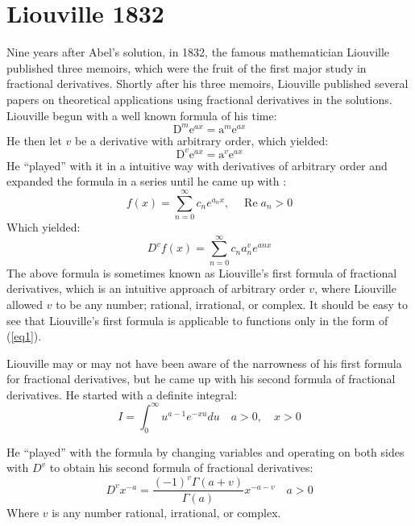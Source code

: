 \documentclass[a4paper,14pt,oneside]{book}
\theoremstyle{plain}
\theoremstyle{definition}
\theoremstyle{remark}
\begin{document}
\section{Liouville 1832}
         \begin{center}
         \begin{flushleft} 
         \justify
         \Large{
\par{Nine years after Abel's solution, in 1832, the famous mathematician Liouville published three memoirs, which were the fruit of the first major study in fractional derivatives. Shortly after his three memoirs, Liouville published several papers on theoretical applications using fractional derivatives in the solutions. Liouville begun with a well known formula of his time:
$$
\mathrm{D}^{m} \mathrm{e}^{ax}=\mathrm{a}^{m} \mathrm{e}^{ax}
$$He then let $v$ be a derivative with arbitrary order, which yielded:
$$
\mathrm{D}^{v} \mathrm{e}^{ax}=\mathrm{a}^{v} \mathrm{e}^{ax}
$$He \enquote{played} with it in a intuitive way with derivatives of arbitrary order and expanded the formula in a series until he came up with :
\begin{equation}\label{eq1}
f(x) =\sum_{n=0}^{\infty} c_{n} e^{a_{n}x}, \quad \operatorname{Re} a_{n}>0 
\end{equation}
Which yielded:
$$
D^{v} f(x)=\sum_{n=0}^{\infty} c_{n} a_{n}^{v} e^{anx}
$$The above formula is sometimes known as Liouville's first formula of fractional derivatives, which is an intuitive approach of arbitrary order $v$, where Liouville allowed $v$ to be any number; rational, irrational, or complex. It should be easy to see that Liouville's first formula is applicable to functions only in the form of (\ref{eq1}).}}
\Large{
\par{Liouville may or may not have been aware of the narrowness of his first formula for fractional derivatives, but he came up with his second formula of fractional derivatives. He started with a definite integral:
$$
I=\int_{0}^{\infty} u^{a-1} e^{-xu} du \quad a>0, \quad x>0
$$
\par{He \enquote{played} with the formula by changing variables and operating on both sides with $D^{v}$ to obtain his second formula of fractional derivatives:}
\begin{equation}\label{eq2}
D^{v} x^{-a}= \frac{(-1)^{v} \Gamma(a+v)}{\Gamma(a)} x^{-a-v} \quad a>0
\end{equation}
Where $v$ is any number rational, irrational, or complex.}
}
\end{flushleft}
\end{center}
\end{document}
